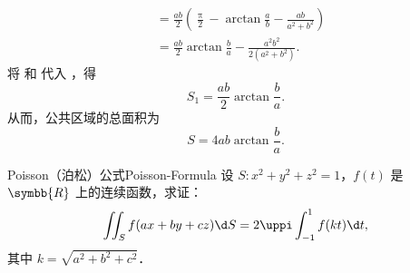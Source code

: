 \begin{solution}
\begin{equation}
\begin{aligned}
                                                                                  & = \frac{ab}{2} \left( \frac{\uppi}{2} - \arctan \frac{a}{b} - \frac{ab}{a^2 + b^2} \right)             \\
                                                                                  & = \frac{ab}{2} \arctan \frac{b}{a} - \frac{a^2 b^2}{2(a^2 + b^2)}.
        \end{aligned}
    \end{equation}
    将  和  代入 ，得
    \begin{equation}
        \label{eq:s1-result}
        S_1 = \frac{ab}{2} \arctan \frac{b}{a}.
    \end{equation}
    从而，公共区域的总面积为
    \begin{equation}
        S = \boxed{4ab \arctan \frac{b}{a}}.
    \end{equation}
\end{solution}

\begin{problem}{Poisson（泊松）公式}{Poisson-Formula}
    设 $S : x^2 + y^2 + z^2 = 1$，$f(t)$ 是 $\symbb{R}$ 上的连续函数，求证：
    \begin{equation*}
        \iint_{S} f(ax + by + cz) \d S = 2 \uppi \int_{-1}^{1} f(kt) \d t,
    \end{equation*}
    其中 $k = \sqrt{a^2 + b^2 + c^2}$．
\end{problem}

